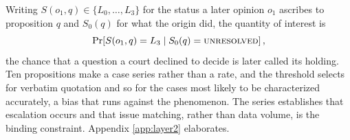 Writing $S(o_1,q)\in\{L_0,\dots,L_3\}$ for the status a later opinion $o_1$
ascribes to proposition $q$ and $S_0(q)$ for what the origin did, the quantity of
interest is
\begin{equation}
\Pr\!\left[S(o_1,q)=L_3 \mid S_0(q)=\textsc{unresolved}\right],
\end{equation}
the chance that a question a court declined to decide is later called its
holding. Ten propositions make a case series rather than a rate, and the
threshold selects for verbatim quotation and so for the cases most likely to be
characterized accurately, a bias that runs against the phenomenon. The series
establishes that escalation occurs and that issue matching, rather than data
volume, is the binding constraint. Appendix \ref{app:layer2} elaborates.
